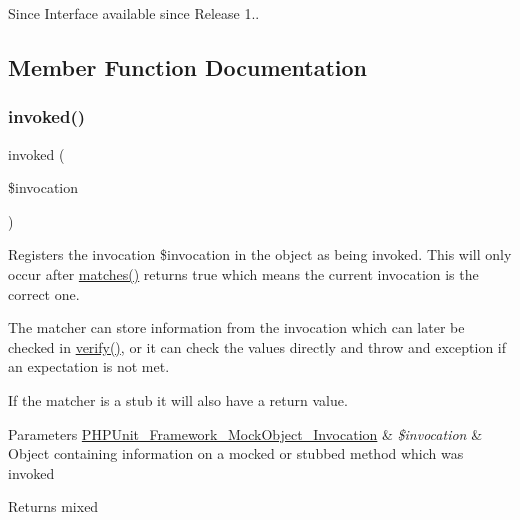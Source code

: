 \begin{DoxySince}{Since}
Interface available since Release 1.. 
\end{DoxySince}


\subsection{Member Function Documentation}
\mbox{\label{interface_p_h_p_unit___framework___mock_object___matcher___invocation_a63f37b06181c9547bc3c225007c34425}} 
\subsubsection{\texorpdfstring{invoked()}{invoked()}}
{\footnotesize\ttfamily invoked (\begin{DoxyParamCaption}\item[{\mbox{\hyperlink{interface_p_h_p_unit___framework___mock_object___invocation}{P\+H\+P\+Unit\+\_\+\+Framework\+\_\+\+Mock\+Object\+\_\+\+Invocation}}}]{\$invocation }\end{DoxyParamCaption})}

Registers the invocation \$invocation in the object as being invoked. This will only occur after \mbox{\hyperlink{interface_p_h_p_unit___framework___mock_object___matcher___invocation_a4988c6fa11e275302172d0a4ae32dd3a}{matches()}} returns true which means the current invocation is the correct one.

The matcher can store information from the invocation which can later be checked in \mbox{\hyperlink{interface_p_h_p_unit___framework___mock_object___verifiable_aa33600b6a1b28d0c4dfe4d468272aaa4}{verify()}}, or it can check the values directly and throw and exception if an expectation is not met.

If the matcher is a stub it will also have a return value.


\begin{DoxyParams}[1]{Parameters}
\mbox{\hyperlink{interface_p_h_p_unit___framework___mock_object___invocation}{P\+H\+P\+Unit\+\_\+\+Framework\+\_\+\+Mock\+Object\+\_\+\+Invocation}} & {\em \$invocation} & Object containing information on a mocked or stubbed method which was invoked\\
\hline
\end{DoxyParams}
\begin{DoxyReturn}{Returns}
mixed 
\end{DoxyReturn}


